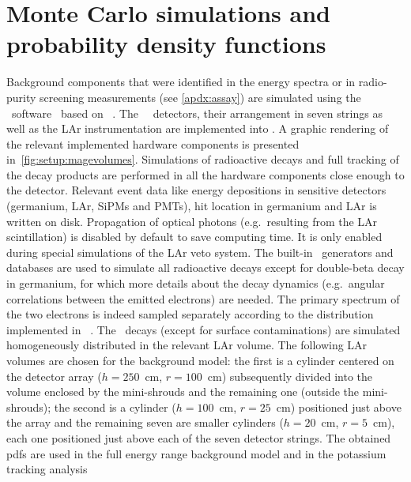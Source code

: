 
\chapter{Monte Carlo simulations and probability density functions}%
\label{apdx:magepdfs}

Background components that were identified in the energy spectra or in radio-purity
screening measurements (see \cref{apdx:assay}) are simulated using the \mage\
software~\cite{Boswell2011} based on \geant~\cite{Agostinelli2002, Allison2006,
Allison2016}.  The \gerda\ \phasetwo\ detectors, their arrangement in seven strings as
well as the LAr instrumentation are implemented into \mage. A graphic rendering of the
relevant implemented hardware components is presented in~\cref{fig:setup:magevolumes}.
\newpar
Simulations of radioactive decays and full tracking of the decay products are performed in
all the hardware components close enough to the detector. Relevant event data like energy
depositions in sensitive detectors (germanium, LAr, SiPMs and PMTs), hit location in
germanium and LAr is written on disk. Propagation of optical photons (e.g.~resulting from
the LAr scintillation) is disabled by default to save computing time. It is only enabled
during special simulations of the LAr veto system.  The built-in \geant\ generators and
databases are used to simulate all radioactive decays except for double-beta decay in
germanium, for which more details about the decay dynamics (e.g.~angular correlations
between the emitted electrons) are needed. The primary spectrum of the two electrons is
indeed sampled separately according to the distribution implemented in
\decayzero~\cite{Ponkratenko2000}.
\newpar
The \kvz\ decays (except for surface contaminations) are simulated homogeneously
distributed in the relevant LAr volume. The following LAr volumes are chosen for the
background model: the first is a cylinder centered on the detector array ($h=250$~cm,
$r=100$~cm) subsequently divided into the volume enclosed by the mini-shrouds and the
remaining one (outside the mini-shrouds); the second is a cylinder ($h=100$~cm, $r=25$~cm)
positioned just above the array and the remaining seven are smaller cylinders ($h=20$~cm,
$r=5$~cm), each one positioned just above each of the seven detector strings. The obtained
pdfs are used in the full energy range background model and in the potassium tracking
analysis


